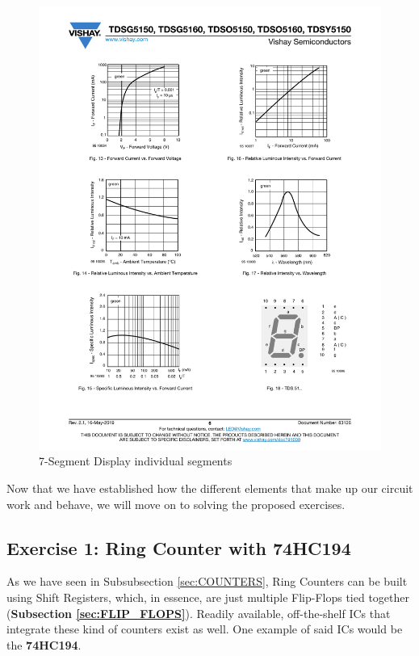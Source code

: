 \begin{figure}[H]
    \centering
    \includegraphics[]{Graphics/Practice 5/7-SEG/SEGMENTS.pdf}
    \caption{7-Segment Display individual segments ~\autocite{7-SEGMENT}}
    \label{fig:7-SEG-SEGMENTS}
\end{figure}

\clearpage

Now that we have established how the different elements that make up our circuit work and behave, we will move on to solving the proposed exercises.

\subsection{Exercise 1: Ring Counter with 74HC194}

As we have seen in Subsubsection \ref{sec:COUNTERS}, Ring Counters can be built using Shift Registers, which, in essence, are just multiple Flip-Flops tied together (\textbf{Subsection \ref{sec:FLIP_FLOPS}}). Readily available, off-the-shelf ICs that integrate these kind of counters exist as well. One example of said ICs would be the \textbf{74HC194}. \medskip


